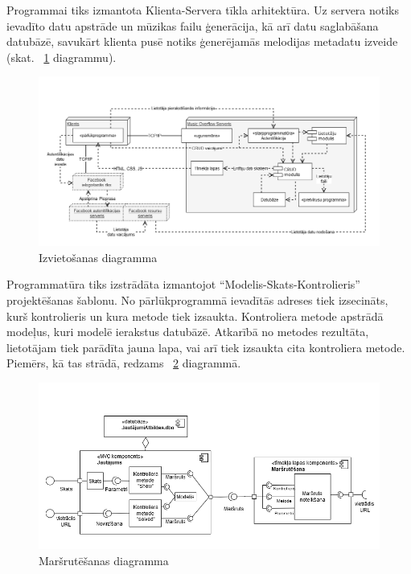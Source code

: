 \documentclass[12pt]{article}
\begin{document}
Programmai tiks izmantota Klienta-Servera tīkla arhitektūra. Uz servera notiks ievadīto datu apstrāde un mūzikas failu ģenerācija, kā arī datu saglabāšana datubāzē, savukārt klienta pusē notiks ģenerējamās melodijas metadatu izveide (skat. ~\ref{fig:deployment_diagram} diagrammu).

\begin{figure}[H]
\begin{center}
	\includegraphics[scale=0.35]{DeploymentDiagram.png}
	\caption{Izvietošanas diagramma}
	\label{fig:deployment_diagram}
\end{center}
\end{figure}

Programmatūra tiks izstrādāta izmantojot ``Modelis-Skats-Kontrolieris'' projektēšanas šablonu. No pārlūkprogrammā ievadītās adreses tiek izsecināts, kurš kontrolieris un kura metode tiek izsaukta. Kontroliera metode apstrādā modeļus, kuri modelē ierakstus datubāzē. Atkarībā no metodes rezultāta, lietotājam tiek parādīta jauna lapa, vai arī tiek izsaukta cita kontroliera metode. Piemērs, kā tas strādā, redzams ~\ref{fig:routing} diagrammā. 

\begin{figure}[H]
\begin{center}
	\includegraphics[scale=0.5]{routing.png}
	\caption{Maršrutēšanas diagramma}
	\label{fig:routing}
\end{center}
\end{figure}
\end{document}
